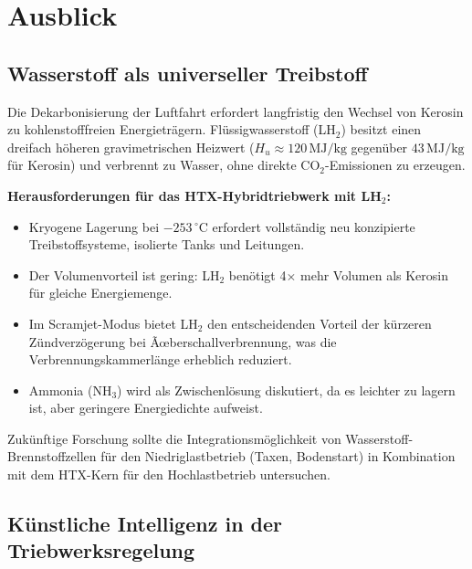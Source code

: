 ﻿\documentclass[12pt,a4paper]{article}
\theoremstyle{remark}
\begin{document}
\section{Ausblick}
\label{sec:ausblick}

\subsection{Wasserstoff als universeller Treibstoff}

Die Dekarbonisierung der Luftfahrt erfordert langfristig den Wechsel von
Kerosin zu kohlenstofffreien Energietr\"agern.
Fl\"ussigwasserstoff (LH$_2$) besitzt einen dreifach h\"oheren gravimetrischen Heizwert
($H_u \approx 120\,\mathrm{MJ/kg}$ gegen\"uber $43\,\mathrm{MJ/kg}$ f\"ur Kerosin)
und verbrennt zu Wasser, ohne direkte CO$_2$-Emissionen zu erzeugen.

\textbf{Herausforderungen f\"ur das HTX-Hybridtriebwerk mit LH$_2$:}
\begin{itemize}
  \item Kryogene Lagerung bei $-253\,^\circ\mathrm{C}$ erfordert vollst\"andig neu konzipierte
        Treibstoffsysteme, isolierte Tanks und Leitungen.
  \item Der Volumenvorteil ist gering: LH$_2$ ben\"otigt 4$\times$ mehr Volumen als Kerosin
        f\"ur gleiche Energiemenge.
  \item Im Scramjet-Modus bietet LH$_2$ den entscheidenden Vorteil der
        k\"urzeren Z\"undverz\"ogerung bei Ãœberschallverbrennung,
        was die Verbrennungskammerl\"ange erheblich reduziert.
  \item Ammonia (NH$_3$) wird als Zwischenl\"osung diskutiert,
        da es leichter zu lagern ist, aber geringere Energiedichte aufweist.
\end{itemize}

Zuk\"unftige Forschung sollte die Integrations\-m\"oglichkeit von
Wasserstoff-Brennstoffzellen f\"ur den Niedriglastbetrieb (Taxen, Bodenstart)
in Kombination mit dem HTX-Kern f\"ur den Hochlastbetrieb untersuchen.

\subsection{K\"unstliche Intelligenz in der Triebwerksregelung}
\end{document}

